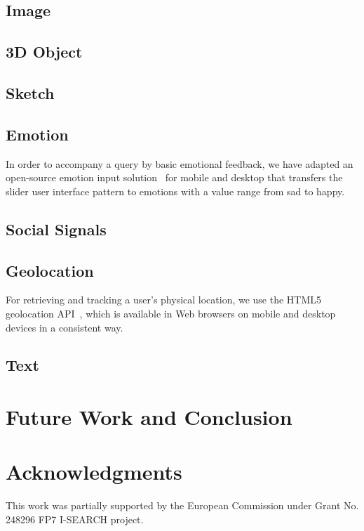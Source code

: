 \documentclass{acm_proc_article-sp}
\newcommand{\inlinelistingsize}{\fontsize{8pt}{11pt}}
\let\oldttdefault\ttdefault
\renewcommand{\ttdefault}{pcr}
\let\oldurl\url
\renewcommand{\url}[1]{\inlinelistingsize\oldurl{#1}}
\begin{document}
\subsection{Image}
\subsection{3D Object}
\subsection{Sketch}
\subsection{Emotion}
In order to accompany a query by basic emotional feedback, we have adapted an open-source emotion input solution~\cite{emotionslider} for mobile and desktop that transfers the slider user interface pattern to emotions with a value range from sad to happy. 

\subsection{Social Signals}
\subsection{Geolocation}
For retrieving and tracking a user's physical location, we use the HTML5 geolocation API~\cite{geolocation}, which is available in Web browsers on mobile and desktop devices in a consistent way.

\subsection{Text}

\section{Future Work and Conclusion}

\section{Acknowledgments}
This work was partially supported by the European Commission under Grant No. 248296 FP7 \mbox{I-SEARCH} project.

\let\ttdefault\oldttdefault
\let\url\oldurl




\balancecolumns
\end{document}
